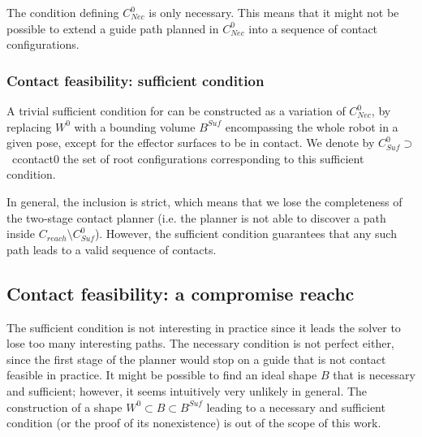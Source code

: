 The condition defining $C^0_{Nec}$ is only necessary. This means that it might not be possible to extend a guide path planned 
in $C^0_{Nec}$ into a sequence of contact configurations.

\subsubsection*{Contact feasibility: sufficient condition}
A trivial sufficient condition for  can be constructed as a variation of $C^0_{Nec}$, by replacing $W^0$ with a bounding volume $B^{Suf}$ encompassing the whole robot in a given pose, except for the effector surfaces to be in contact. We denote by \mbox{$C_{Suf}^0 \supset $ \gls{ccontact0}} the set of root configurations corresponding to this sufficient condition.

In general, the inclusion is strict, which means that we lose the completeness of the two-stage contact planner (i.e. the planner is not able to discover a path inside \mbox{$C_{reach} \setminus C_{Suf}^0$}). However, the sufficient condition guarantees that any such path leads to a valid sequence of contacts.

\subsection{Contact feasibility: a compromise \gls{reachc}}
The sufficient condition is not interesting in practice since it leads the solver to lose too many interesting paths. The necessary condition is not perfect either, since the first stage of the planner would stop on a guide that is not \gls{contact feasible} in practice. It might be possible to find an ideal shape $B$ that is necessary and sufficient; however, it seems intuitively very unlikely in general. The construction of a shape $W^0 \subset B \subset B^{Suf}$ leading to a necessary and sufficient condition (or the proof of its nonexistence) is out of the scope of this work.

